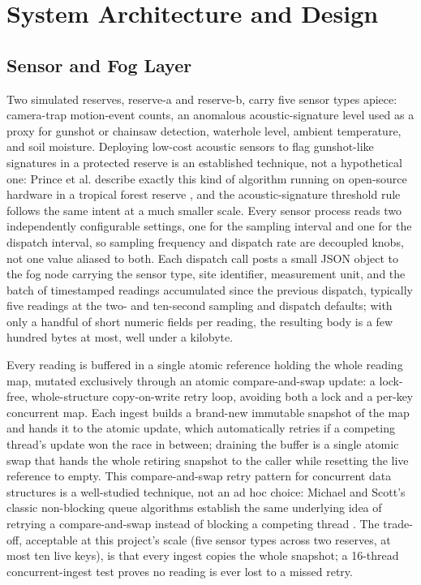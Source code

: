 \documentclass[conference,a4paper]{IEEEtran}
\begin{document}
\section{System Architecture and Design}

\subsection{Sensor and Fog Layer}

Two simulated reserves, reserve-a and reserve-b, carry five sensor types apiece: camera-trap motion-event counts, an anomalous acoustic-signature level used as a proxy for gunshot or chainsaw detection, waterhole level, ambient temperature, and soil moisture. Deploying low-cost acoustic sensors to flag gunshot-like signatures in a protected reserve is an established technique, not a hypothetical one: Prince et al. describe exactly this kind of algorithm running on open-source hardware in a tropical forest reserve \cite{ref3}, and the acoustic-signature threshold rule follows the same intent at a much smaller scale. Every sensor process reads two independently configurable settings, one for the sampling interval and one for the dispatch interval, so sampling frequency and dispatch rate are decoupled knobs, not one value aliased to both. Each dispatch call posts a small JSON object to the fog node carrying the sensor type, site identifier, measurement unit, and the batch of timestamped readings accumulated since the previous dispatch, typically five readings at the two- and ten-second sampling and dispatch defaults; with only a handful of short numeric fields per reading, the resulting body is a few hundred bytes at most, well under a kilobyte.

Every reading is buffered in a single atomic reference holding the whole reading map, mutated exclusively through an atomic compare-and-swap update: a lock-free, whole-structure copy-on-write retry loop, avoiding both a lock and a per-key concurrent map. Each ingest builds a brand-new immutable snapshot of the map and hands it to the atomic update, which automatically retries if a competing thread's update won the race in between; draining the buffer is a single atomic swap that hands the whole retiring snapshot to the caller while resetting the live reference to empty. This compare-and-swap retry pattern for concurrent data structures is a well-studied technique, not an ad hoc choice: Michael and Scott's classic non-blocking queue algorithms establish the same underlying idea of retrying a compare-and-swap instead of blocking a competing thread \cite{ref4}. The trade-off, acceptable at this project's scale (five sensor types across two reserves, at most ten live keys), is that every ingest copies the whole snapshot; a 16-thread concurrent-ingest test proves no reading is ever lost to a missed retry.
\end{document}
